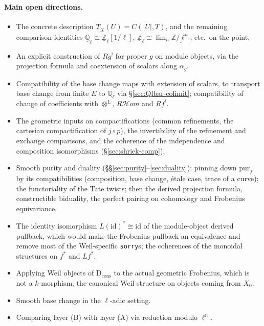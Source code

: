 \documentclass[11pt]{article}
\theoremstyle{remark}
\newcommand{\RHom}{R\mathcal{H}om}
\newcommand{\D}{\mathrm{D}}
\newcommand{\Qlbar}{\overline{\mathbb{Q}}_\ell}
\newcommand{\lotimes}{\otimes^{\mathrm{L}}}
\newcommand{\Dc}{\D_{\mathrm{cons}}}
\begin{document}
\paragraph{Main open directions.}
\begin{itemize}
\item The concrete description $\underline T_X(U)=C(|U|,T)$, and the remaining comparison
  identities
  $\underline{\mathbb Q}_\ell\cong\underline{\mathbb Z}_\ell[1/\ell]$,
  $\underline{\mathbb Z}_\ell\cong\lim_n\underline{\mathbb Z/\ell^n}$, etc.\ on the point.
\item An explicit construction of $Rg^!$ for proper $g$ on module objects, via the
  projection formula and coextension of scalars along $\alpha_g$.
\item Compatibility of the base change maps with extension of scalars, to transport base
  change from finite $E$ to $\Qlbar$ via \S\ref{sec:Qlbar-colimit}; compatibility of change of
  coefficients with $\lotimes$, $\RHom$ and $Rf^!$.
\item The geometric inputs on compactifications (common refinements, the cartesian
  compactification of $j\circ p$), the invertibility of the refinement and exchange comparisons,
  and the coherence of the independence and composition isomorphisms
  (\S\ref{sec:shriek-comp}).
\item Smooth purity and duality (\S\S\ref{sec:purity}--\ref{sec:duality}): pinning down
  $\mathrm{pur}_f$ by its compatibilities (composition, base change, \'etale case, trace of a
  curve); the functoriality of the Tate twists; then the derived projection formula,
  constructible biduality, the perfect pairing on cohomology and Frobenius equivariance.
\item The identity isomorphism $L(\mathrm{id})^*\cong\mathrm{id}$ of the module-object derived
  pullback, which would make the Frobenius pullback an equivalence and remove most of the
  Weil-specific \texttt{sorry}s; the coherences of the monoidal structures on $f^*$ and $Lf^*$.
\item Applying Weil objects of $\Dc$ to the actual geometric Frobenius, which is not a
  $k$-morphism; the canonical Weil structure on objects coming from $X_0$.
\item Smooth base change in the $\ell$-adic setting.
\item Comparing layer (B) with layer (A) via reduction modulo $\ell^n$.
\end{itemize}
\end{document}
